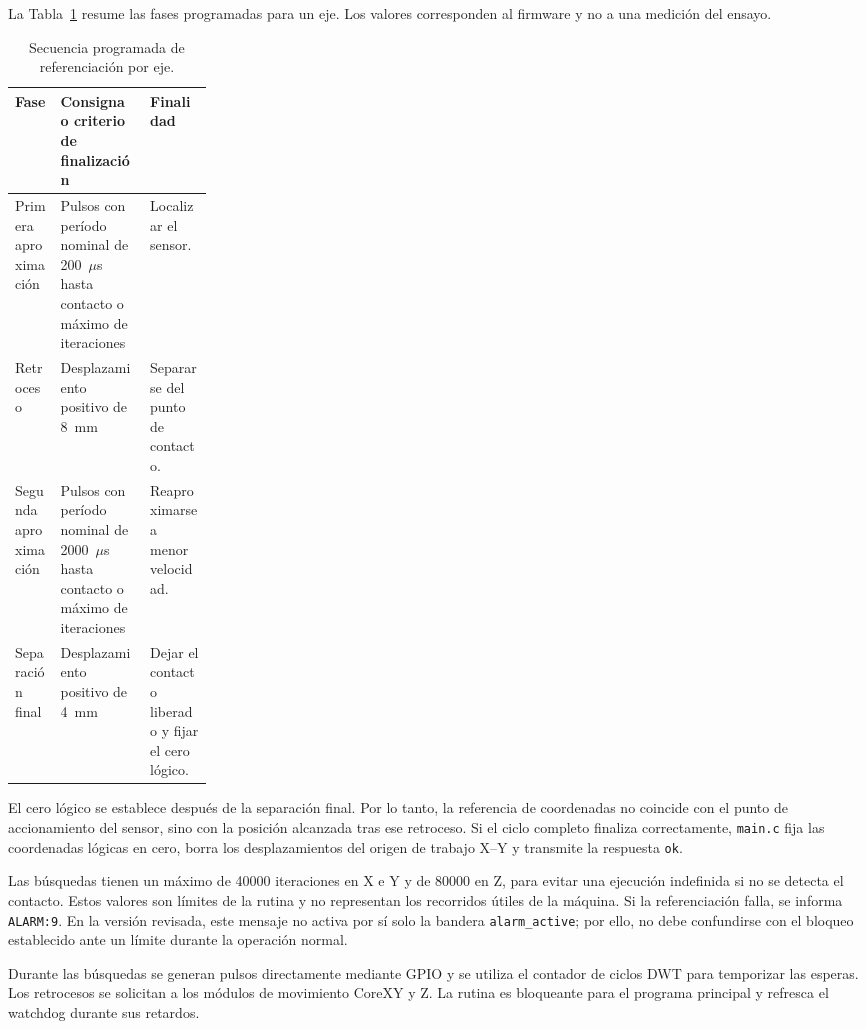 \documentclass[blue,fullpaper]{ludusofficial}  %
\begin{document}
La Tabla~\ref{tab:secuencia-homing} resume las fases
programadas para un eje. Los valores corresponden
al firmware y no a una medición del ensayo.

\begin{table}[htbp]
\centering\small
\caption{Secuencia programada de referenciación por eje.}
\label{tab:secuencia-homing}
\begin{tabularx}{\linewidth}{p{0.23\linewidth}XX}
\hline
Fase & Consigna o criterio de finalización & Finalidad \\
\hline
Primera aproximación & Pulsos con período nominal de 200~$\mu$s hasta contacto o máximo de iteraciones & Localizar el sensor. \\
Retroceso & Desplazamiento positivo de 8~mm & Separarse del punto de contacto. \\
Segunda aproximación & Pulsos con período nominal de 2000~$\mu$s hasta contacto o máximo de iteraciones & Reaproximarse a menor velocidad. \\
Separación final & Desplazamiento positivo de 4~mm & Dejar el contacto liberado y fijar el cero lógico. \\
\hline
\end{tabularx}
\end{table}

El cero lógico se establece después de la separación
final. Por lo tanto, la referencia de coordenadas
no coincide con el punto de accionamiento del sensor,
sino con la posición alcanzada tras ese retroceso.
Si el ciclo completo finaliza correctamente,
\texttt{main.c} fija las coordenadas lógicas en cero,
borra los desplazamientos del origen de trabajo X--Y
y transmite la respuesta \texttt{ok}.

Las búsquedas tienen un máximo de 40000 iteraciones
en X e Y y de 80000 en Z, para evitar una ejecución
indefinida si no se detecta el contacto. Estos valores
son límites de la rutina y no representan los recorridos
útiles de la máquina. Si la referenciación falla,
se informa \texttt{ALARM:9}. En la versión revisada,
este mensaje no activa por sí solo la bandera
\texttt{alarm\_active}; por ello, no debe confundirse
con el bloqueo establecido ante un límite durante
la operación normal.

Durante las búsquedas se generan pulsos directamente
mediante GPIO y se utiliza el contador de ciclos DWT
para temporizar las esperas. Los retrocesos se solicitan
a los módulos de movimiento CoreXY y Z. La rutina
es bloqueante para el programa principal y refresca
el watchdog durante sus retardos.
\end{document}
